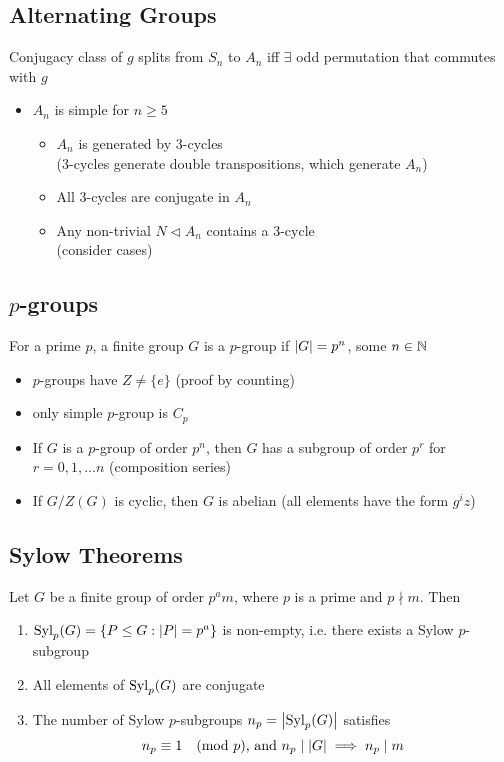 \subsection*{Alternating Groups}
Conjugacy class of $g$ splits from $S_n$ to $A_n$ iff $\exists$ odd permutation that commutes with $g$
\begin{itemize}
      \item $A_n$ is simple for $n \geq 5$
            \begin{itemize}
                  \item $A_n$ is generated by 3-cycles \\
                        (3-cycles generate double transpositions, which generate $A_n$)
                  \item All 3-cycles are conjugate in $A_n$
                  \item Any non-trivial $N \triangleleft A_n$ contains a 3-cycle \\ (consider cases)
            \end{itemize}
\end{itemize}

\subsection*{$p$-groups}
For a prime $p$, a finite group $G$ is a $p$-group if $\left| G \right| = p^n$, some $n \in \mathbb{N}$
\begin{itemize}
      \item $p$-groups have $Z \neq \{e\}$ (proof by counting)
      \item only simple $p$-group is $C_p$
      \item If $G$ is a $p$-group of order $p^n$, then $G$ has a subgroup of order $p^r$ for $r=0,1,\dots n$ (composition series)
      \item If $G/Z(G)$ is cyclic, then $G$ is abelian (all elements have the form $g^i z$)
\end{itemize}

\subsection*{Sylow Theorems}
Let $G$ be a finite group of order $p^am$, where $p$ is a prime and $p \nmid m$. Then
\begin{enumerate}
      \item $\operatorname{Syl}_p(G) = \{ P \leq G: \left| P \right| = p^a\}$ is non-empty, i.e. there exists a Sylow $p$-subgroup
      \item All elements of $\operatorname{Syl}_p(G)$ are conjugate
      \item The number of Sylow $p$-subgroups $n_p = \left| \operatorname{Syl}_p(G) \right|$ satisfies \[n_p \equiv 1  \quad (\text{mod } p) \text{, and } n_p \mid \left| G \right| \implies n_p \mid m\]
\end{enumerate}


